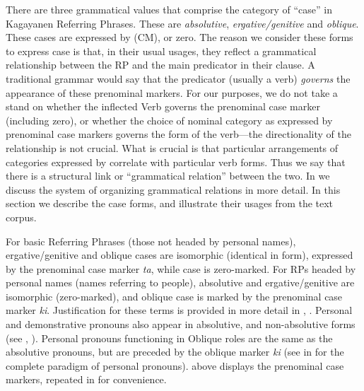 There are three grammatical values that comprise the category of “case” in Kagayanen Referring Phrases. These are \textit{absolutive}, \textit{ergative/genitive} and \textit{oblique}. These cases are expressed by  (CM), or zero. The reason we consider these forms to express case is that, in their usual usages, they reflect a grammatical relationship between the RP and the main predicator in their clause. A traditional grammar would say that the predicator (usually a verb) \textit{governs} the appearance of these prenominal markers. For our purposes, we do not take a stand on whether the inflected Verb governs the prenominal case marker (including zero), or whether the choice of nominal category as expressed by prenominal case markers governs the form of the verb---the directionality of the relationship is not crucial. What is crucial is that particular arrangements of categories expressed by  correlate with particular verb forms. Thus we say that there is a structural link or “grammatical relation” between the two. In  we discuss the system of organizing grammatical relations in more detail. In this section we describe the case forms, and illustrate their usages from the text corpus.

For basic Referring Phrases (those not headed by personal names), ergative/genitive and oblique cases are isomorphic (identical in form), expressed by the prenominal case marker \textit{ta}, while  case is zero-marked. For RPs headed by personal names (names referring to people), absolutive and ergative/genitive are isomorphic (zero-marked), and oblique case is marked by the prenominal case marker \textit{ki}.  Justification for these terms is provided in more detail in , . Personal and demonstrative pronouns also appear in absolutive, and non-absolutive forms (see , ). Personal pronouns functioning in Oblique roles are the same as the absolutive pronouns, but are preceded by the oblique marker \textit{ki} (see  in  for the complete paradigm of personal pronouns).  above displays the prenominal case markers, repeated in  for convenience.

